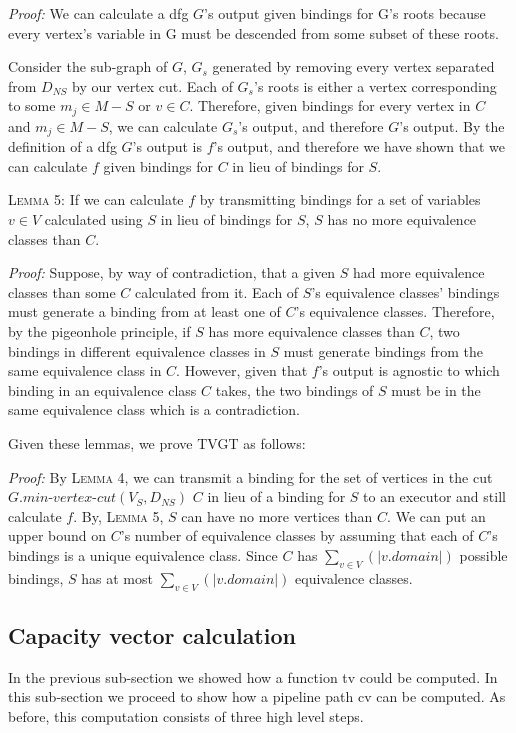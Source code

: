 \noindent \textit{Proof:}  We can calculate a dfg $G$'s output given bindings for G's roots because every vertex's variable in G must be descended from some subset of these roots. 

Consider the sub-graph of $G$, $G_s$ generated by removing every vertex separated from $D_{NS}$ by our vertex cut. Each of $G_s$'s roots is either a vertex corresponding to some $m_j \in M - S$ or $v \in C$. Therefore, given bindings for every vertex in $C$ and $m_j \in M - S$, we can calculate $G_s$'s output, and therefore $G$'s output. By the definition of a dfg $G$'s output is $f$'s output, and therefore we have shown that we can calculate $f$ given bindings for $C$ in lieu of bindings for $S$.

\vspace{2mm}
\noindent \textsc{Lemma 5:} If we can calculate $f$ by transmitting bindings for a set of variables $v \in V$ calculated using $S$ in lieu of bindings for $S$, $S$ has no more equivalence classes than $C$.
\vspace{2mm}

\noindent \textit{Proof:} Suppose, by way of contradiction, that a given $S$ had more equivalence classes than some $C$ calculated from it. Each of $S$'s equivalence classes' bindings must generate a binding from at least one of $C$'s equivalence classes. Therefore, by the pigeonhole principle, if $S$ has more equivalence classes than $C$, two bindings in different equivalence classes in $S$ must generate bindings from the same equivalence class in $C$. However, given that $f$'s output is agnostic to which binding in an equivalence class $C$ takes, the two bindings of $S$ must be in the same equivalence class which is a contradiction.
\vspace{2mm}

\noindent Given these lemmas, we prove TVGT as follows:
\vspace{2mm}

\noindent \textit{Proof:}
By \textsc{Lemma 4}, we can transmit a binding for the set of vertices in the cut $G.\textit{min-vertex-cut}(V_S, D_{NS})$ $C$ in lieu of a binding for $S$ to an executor and still calculate $f$. By, \textsc{Lemma 5}, $S$ can have no more vertices than $C$. We can put an upper bound on $C$'s number of equivalence classes by assuming that each of $C$'s bindings is a unique equivalence class. Since $C$  has $\sum_{v \in V}(|v.domain|)$ possible bindings, $S$ has at most $\sum_{v \in V}(|v.domain|)$ equivalence classes.

\subsection{Capacity vector calculation}
\label{subsec:tv-calculation}
In the previous sub-section we showed how a function tv could be computed. In this sub-section we proceed to show how a pipeline path cv can be computed. As before, this computation consists of three high level steps.

